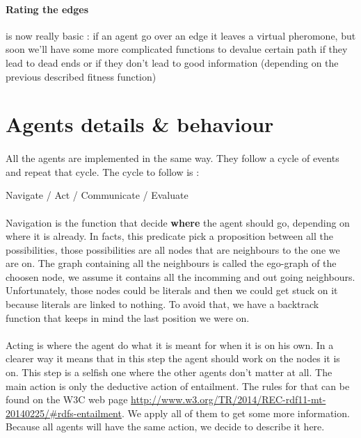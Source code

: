 \documentclass{article}
\begin{document}
			\paragraph{Rating the edges} is now really basic : if an agent go over an edge it leaves a virtual pheromone,
				but soon we'll have some more complicated functions to devalue certain path if they lead to dead ends or
				if they don't lead to good information (depending on the previous described fitness function)

\section{Agents details \& behaviour}
	\paragraph{}
		All the agents are implemented in the same way.
		They follow a cycle of events and repeat that cycle.
		The cycle to follow is :
	\begin{center}
		Navigate / Act / Communicate / Evaluate
	\end{center}
	\paragraph{}
		Navigation is the function that decide \textbf{where} the agent should go, depending on where it is already.
		In facts, this predicate pick a proposition between all the possibilities,
		those possibilities are all nodes that are neighbours to the one we are on.
		The graph containing all the neighbours is called the ego-graph of the choosen node,
		we assume it contains all the incomming and out going neighbours.
		Unfortunately, those nodes could be literals and then we could get stuck on it because literals are linked to nothing.
		To avoid that, we have a backtrack function that keeps in mind the last position we were on.
	\paragraph{}
		Acting is where the agent do what it is meant for when it is on his own.
		In a clearer way it means that in this step the agent should work on the nodes it is on.
		This step is a selfish one where the other agents don't matter at all.
		The main action is only the deductive action of entailment.
		The rules for that can be found on the W3C web page \url{http://www.w3.org/TR/2014/REC-rdf11-mt-20140225/#rdfs-entailment}.
		We apply all of them to get some more information.
		Because all agents will have the same action, we decide to describe it here.
\end{document}

